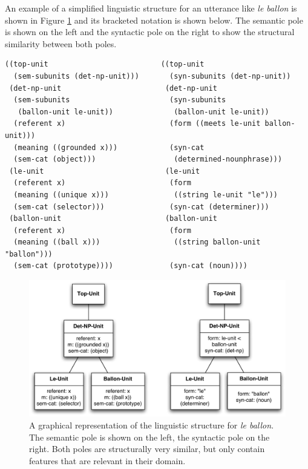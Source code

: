 An example of a simplified linguistic structure for an utterance like
\textit{le ballon} is shown in Figure \ref{f:cfs-le-ballon} and its
bracketed notation is shown below. The semantic pole is shown on the
left and the syntactic pole on the right to show the structural
similarity between both poles.

\scriptsize
\begin{Verbatim}[frame=lines, label=Example linguistic structure for "le ballon"]
((top-unit                          ((top-unit
  (sem-subunits (det-np-unit)))       (syn-subunits (det-np-unit))
 (det-np-unit                        (det-np-unit
  (sem-subunits                       (syn-subunits 
   (ballon-unit le-unit))              (ballon-unit le-unit))
  (referent x)                        (form ((meets le-unit ballon-unit)))
  (meaning ((grounded x)))            (syn-cat 
  (sem-cat (object)))                  (determined-nounphrase)))
 (le-unit                            (le-unit 
  (referent x)                        (form 
  (meaning ((unique x)))               ((string le-unit "le")))
  (sem-cat (selector)))               (syn-cat (determiner)))
 (ballon-unit                        (ballon-unit 
  (referent x)                        (form 
  (meaning ((ball x)))                 ((string ballon-unit "ballon")))           
  (sem-cat (prototype))))             (syn-cat (noun))))
\end{Verbatim}
\normalsize

\begin{figure}[htbp]
  \begin{center}
    \includegraphics[width=.8\textwidth]{./frameworks/figures/cfs-le-ballon.pdf}
    \caption[Example coupled feature structure for \textit{le ballon}]{A
      graphical representation of the linguistic structure for \textit{le
      ballon}. The semantic pole is shown on the left, the syntactic
      pole on the right. Both poles are structurally very similar, but
      only contain features that are relevant in their domain.}
    \label{f:cfs-le-ballon}
  \end{center}
\end{figure}

